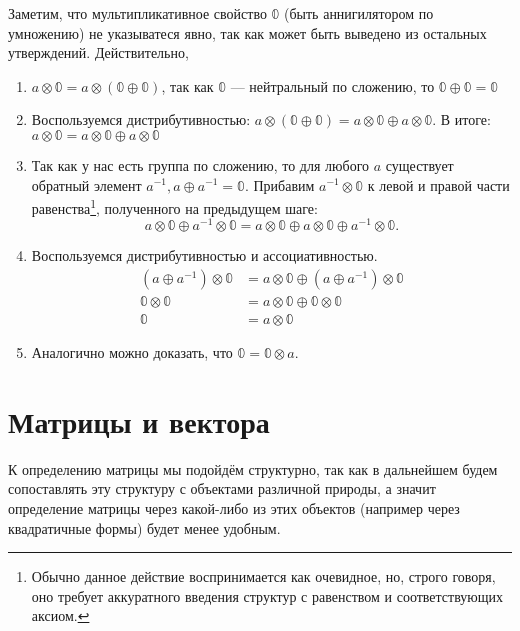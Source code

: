 \begin{definition}
Заметим, что мультипликативное свойство $\mathbb{0}$ (быть аннигилятором по умножению) не указыватеся явно, так как может быть выведено из остальных утверждений. Действительно, 
\begin{enumerate}
	\item $a \otimes \mathbb{0} = a \otimes (\mathbb{0} \oplus \mathbb{0})$, так как $\mathbb{0}$ --- нейтральный по сложению, то $\mathbb{0} \oplus \mathbb{0} = \mathbb{0}$
	\item Воспользуемся дистрибутивностью: $a \otimes (\mathbb{0} \oplus \mathbb{0}) = a \otimes \mathbb{0} \oplus a \otimes \mathbb{0}$. В итоге: $a \otimes \mathbb{0} = a \otimes \mathbb{0} \oplus a \otimes \mathbb{0}$
	\item Так как у нас есть группа по сложению, то для любого $a$ существует обратный элемент $a^{-1}, a \oplus a^{-1} = \mathbb{0}$. Прибавим $a^{-1} \otimes \mathbb{0}$ к левой и правой части равенства\footnote{Обычно данное действие воспринимается как очевидное, но, строго говоря, оно требует аккуратного введения структур с равенством и соответствующих аксиом.}, полученного на предыдущем шаге: 
	$$a \otimes \mathbb{0} \oplus a^{-1} \otimes \mathbb{0} = a \otimes \mathbb{0} \oplus a \otimes \mathbb{0} \oplus a^{-1} \otimes \mathbb{0}.$$
	\item Воспользуемся дистрибутивностью и ассоциативностью.
	\begin{align*}
	(a \oplus a^{-1}) \otimes \mathbb{0} & = a \otimes \mathbb{0} \oplus (a  \oplus a^{-1}) \otimes \mathbb{0} \\
	\mathbb{0} \otimes \mathbb{0} & = a \otimes \mathbb{0} \oplus \mathbb{0} \otimes \mathbb{0} \\
	\mathbb{0} & = a \otimes \mathbb{0}
	\end{align*}	
	\item Аналогично можно доказать, что $\mathbb{0} = \mathbb{0} \otimes a$.
\end{enumerate}

\end{definition}



\section{Матрицы и вектора}

К определению матрицы мы подойдём структурно, так как в дальнейшем будем сопоставлять эту структуру с объектами различной природы, а значит определение матрицы через какой-либо из этих объектов (например через квадратичные формы) будет менее удобным.


